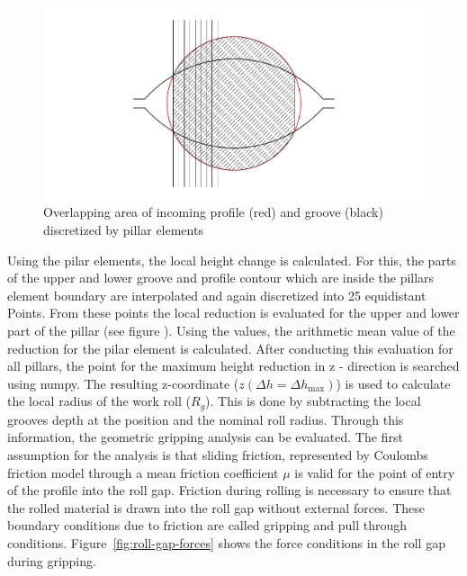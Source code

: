 \documentclass[11pt]{PyRollDocs}
\begin{document}
    \begin{figure}
        \centering
        \includegraphics[width=.85\linewidth]{img/gripping-pillars}
        \caption{Overlapping area of incoming profile (red) and groove (black) discretized by pillar elements}
        \label{fig:roll-gap-profile-with-pillars}
    \end{figure}

    Using the pilar elements, the local height change is calculated.
    For this, the  parts of the upper and lower groove and profile contour which are inside the pillars element boundary are interpolated and
    again discretized into 25 equidistant Points.
    From these points the local reduction is evaluated for the upper and lower part of the pillar (see figure ).
    Using the values, the arithmetic mean value of the reduction for the pilar element is calculated.
    After conducting this evaluation for all pillars, the point for the maximum height reduction in z - direction is searched using numpy.
    The resulting z-coordinate ($z(\Delta h = \Delta h_{\max})$) is used to calculate the local radius of the work roll ($R_{g}$).
    This is done by subtracting the local grooves depth at the position and the nominal roll radius.
    Through this information, the geometric gripping analysis can be evaluated.
    The first assumption for the analysis is that sliding friction,
    represented by Coulombs friction model through a mean friction coefficient $\mu$ is valid for the point of entry of the profile into the roll gap.
    Friction during rolling is necessary to ensure that the rolled material is drawn into the roll gap without external forces.
    These boundary conditions due to friction are called gripping and pull through conditions.
    Figure~\ref{fig:roll-gap-forces} shows the force conditions in the roll gap during gripping.
\end{document}
